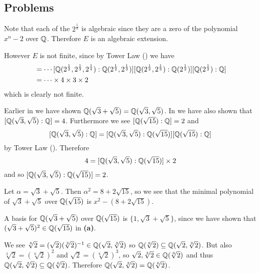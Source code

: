 \subsection*{Problems}
\begin{questions}
    \item Note that each of the $2^{\frac1n}$ is algebraic since they are a zero of the polynomial $x^n - 2$ over $\mathbb{Q}$. Therefore $E$ is an algebraic extension.

    However $E$ is not finite, since by Tower Law () we have
    \begin{align*}
        [E: F] &= \cdots[\Q(2^{\frac12},2^{\frac13},2^{\frac14}):\Q(2^{\frac12},2^{\frac13})]
        [\Q(2^{\frac12},2^{\frac13}):\Q(2^{\frac12})][\Q(2^{\frac12}):\Q]\\
        &= \cdots \times 4 \times 3 \times 2
    \end{align*}
    which is clearly not finite.

    \item Earlier in  we have shown $\mathbb{Q}(\sqrt3 + \sqrt5) = \mathbb{Q}(\sqrt3,\sqrt5)$. In  we have also shown that $[\mathbb{Q}(\sqrt3,\sqrt5):\mathbb{Q}] = 4$. Furthermore we see $[\mathbb{Q}(\sqrt{15}):\mathbb{Q}] = 2$ and
    \[
        [\mathbb{Q}(\sqrt3,\sqrt5):\mathbb{Q}] = [\mathbb{Q}(\sqrt3,\sqrt5):\mathbb{Q}(\sqrt{15})][\mathbb{Q}(\sqrt{15}):\mathbb{Q}]
    \]
    by Tower Law (). Therefore
    \[
        4 = [\mathbb{Q}(\sqrt3,\sqrt5):\mathbb{Q}(\sqrt{15})]\times2
    \]
    and so $[\mathbb{Q}(\sqrt3,\sqrt5):\mathbb{Q}(\sqrt{15})] = 2$.

    \begin{partquestions}{\alph*}
        \item Let $\alpha = \sqrt3 + \sqrt5$. Then $\alpha^2 = 8 + 2\sqrt{15}$, so we see that the minimal polynomial of $\sqrt3+\sqrt5$ over $\mathbb{Q}(\sqrt{15})$ is $x^2 - (8 + 2\sqrt{15})$.

        \item A basis for $\mathbb{Q}(\sqrt3 + \sqrt5)$ over $\mathbb{Q}(\sqrt{15})$ is $\{1, \sqrt3 + \sqrt5\}$, since we have shown that $(\sqrt3 + \sqrt5)^2 \in \mathbb{Q}(\sqrt{15})$ in \textbf{(a)}.
    \end{partquestions}

    \item We see $\sqrt[6]2 = (\sqrt2)(\sqrt[3]2)^{-1} \in \mathbb{Q}(\sqrt2, \sqrt[3]2)$ so $\mathbb{Q}(\sqrt[6]2) \subseteq \mathbb{Q}(\sqrt2,\sqrt[3]2)$. But also $\sqrt[3]2 = \left(\sqrt[6]2\right)^2$ and $\sqrt2 = \left(\sqrt[6]2\right)^3$, so $\sqrt2,\sqrt[3]2 \in \mathbb{Q}(\sqrt[6]2)$ and thus $\mathbb{Q}(\sqrt2,\sqrt[3]2) \subseteq \mathbb{Q}(\sqrt[6]2)$. Therefore $\mathbb{Q}(\sqrt2,\sqrt[3]2) = \mathbb{Q}(\sqrt[6]2)$.


\end{questions}
